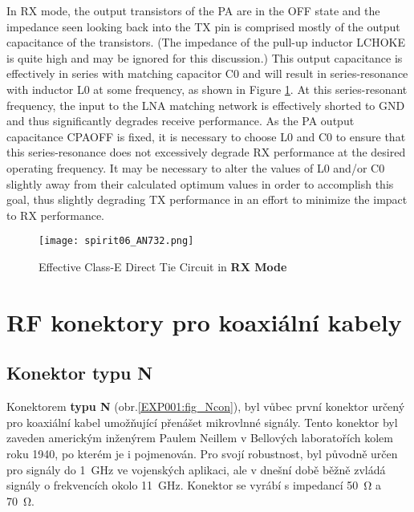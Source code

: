       In RX mode, the output transistors of the PA are in the OFF state and the impedance seen 
      looking back into the TX pin is comprised mostly of the output capacitance of the 
      transistors. (The impedance of the pull-up inductor LCHOKE is quite high and may be ignored 
      for this discussion.) This output capacitance is effectively in series with matching 
      capacitor C0 and will result in series-resonance with inductor L0 at some frequency, as shown 
      in Figure \ref{EXP001:fig_spirit06}. At this series-resonant frequency, the input to the LNA 
      matching network is effectively shorted to GND and thus significantly degrades receive 
      performance. As the PA output capacitance CPAOFF is fixed, it is necessary to choose L0 and 
      C0 to ensure that this series-resonance does not excessively degrade RX performance at the 
      desired operating frequency. It may be necessary to alter the values of L0 and/or C0 slightly 
      away from their calculated optimum values in order to accomplish this goal, thus slightly 
      degrading TX performance in an effort to minimize the impact to RX performance.
      
      \begin{figure}[ht!]  %
        \centering
        \texttt{[image: spirit06\_AN732.png]}
        \caption{Effective Class-E Direct Tie Circuit in \textbf{RX Mode}}
        \label{EXP001:fig_spirit06}
      \end{figure}

  \section{RF konektory pro koaxiální kabely}
    \subsection{Konektor typu N}
      Konektorem \textbf{typu N} (obr.\ref{EXP001:fig_Ncon}), byl vůbec první konektor určený pro 
      koaxiální kabel umožňující přenášet mikrovlnné signály. Tento konektor byl zaveden americkým 
      inženýrem Paulem Neillem v Bellových laboratořích kolem roku 1940, po kterém je i pojmenován. 
      Pro svojí robustnost, byl původně určen pro signály do \qty{1}{\giga\hertz} ve vojenských 
      aplikaci, ale v dnešní době běžně zvládá signály o frekvencích okolo \qty{11}{\giga\hertz}. 
      Konektor se vyrábí s impedancí \qty{50}{\ohm} a \qty{70}{\ohm}.
      
